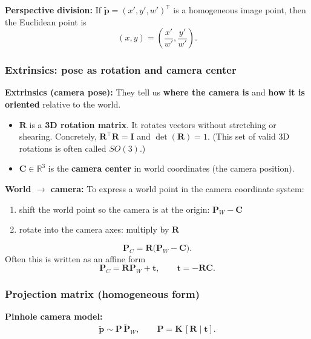 \documentclass[11pt,a4paper]{article}
\newcommand{\R}{\mathbb{R}}
\newcommand{\vct}[1]{\bm{#1}}
\newcommand{\mat}[1]{\mathbf{#1}}
\newcommand{\T}{^\mathsf{T}}
\begin{document}
\begin{mathrule}
\textbf{Perspective division:}
If $\tilde{\vct{p}}=(x',y',w')\T$ is a homogeneous image point, then the Euclidean point is
\[
(x,y)=\left(\frac{x'}{w'},\frac{y'}{w'}\right).
\]
\end{mathrule}

\subsubsection{Extrinsics: pose as rotation and camera center}

\begin{defbox}
\textbf{Extrinsics (camera pose):}
They tell us \textbf{where the camera is} and \textbf{how it is oriented} relative to the world.
\begin{itemize}
  \item $\mat{R}$ is a \textbf{3D rotation matrix}. It rotates vectors without stretching or shearing.
        Concretely, $\mat{R}^\top \mat{R}=\mat{I}$ and $\det(\mat{R})=1$.
        (This set of valid 3D rotations is often called $SO(3)$.)
  \item $\vct{C}\in\R^3$ is the \textbf{camera center} in world coordinates (the camera position).
\end{itemize}
\end{defbox}

\begin{mathrule}
\textbf{World $\rightarrow$ camera:}
To express a world point in the camera coordinate system:
\begin{enumerate}
  \item shift the world point so the camera is at the origin: $\vct{P}_W - \vct{C}$
  \item rotate into the camera axes: multiply by $\mat{R}$
\end{enumerate}
\[
\vct{P}_C = \mat{R}\bigl(\vct{P}_W - \vct{C}\bigr).
\]
Often this is written as an affine form
\[
\vct{P}_C = \mat{R}\vct{P}_W + \vct{t},
\qquad
\vct{t} = -\mat{R}\vct{C}.
\]
\end{mathrule}

\subsubsection{Projection matrix (homogeneous form)}

\begin{mathrule}
\textbf{Pinhole camera model:}
\[
\tilde{\vct{p}} \sim \mat{P}\,\tilde{\vct{P}}_W,
\qquad
\mat{P} = \mat{K}\,[\mat{R}\mid \vct{t}].
\]
\end{mathrule}
\end{document}
